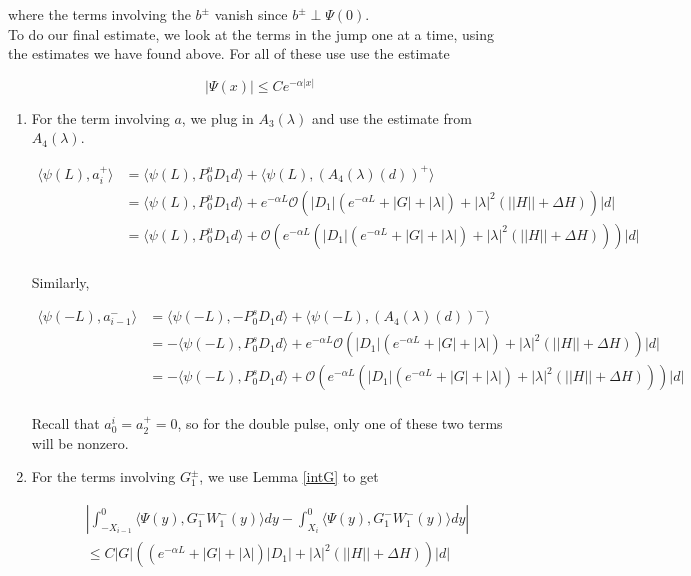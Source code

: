 \documentclass[12pt]{article}
\begin{document}
where the terms involving the $b^\pm$ vanish since $b^\pm \perp \Psi(0)$.\\

To do our final estimate, we look at the terms in the jump one at a time, using the estimates we have found above. For all of these use use the estimate

\[
|\Psi(x)| \leq C e^{-\alpha|x|}
\]

\begin{enumerate}

\item For the term involving $a$, we plug in $A_3(\lambda)$ and use the estimate from $A_4(\lambda)$.

\begin{align*}
\langle \psi(L), a_i^+ \rangle &= \langle \psi(L), P_0^u D_1 d \rangle + \langle \psi(L), (A_4(\lambda)(d))^+\rangle\\
&= \langle \psi(L), P_0^u D_1 d \rangle + e^{-\alpha L} \mathcal{O} \left(|D_1|(e^{-\alpha L} + |G| + |\lambda|) + |\lambda|^2(||H|| + \Delta H )\right)|d|\\
&= \langle \psi(L), P_0^u D_1 d \rangle + \mathcal{O} \left( e^{-\alpha L} \left(|D_1|(e^{-\alpha L} + |G| + |\lambda|) + |\lambda|^2(||H|| + \Delta H )\right)\right)|d|\\
\end{align*}

Similarly,

\begin{align*}
\langle \psi(-L), a_{i-1}^- \rangle &= \langle \psi(-L), -P_0^s D_1 d \rangle + \langle \psi(-L), (A_4(\lambda)(d))^-\rangle\\
&= -\langle \psi(-L), P_0^s D_1 d \rangle + e^{-\alpha L} \mathcal{O} \left(|D_1|(e^{-\alpha L} + |G| + |\lambda|) + |\lambda|^2(||H|| + \Delta H )\right)|d|\\
&= -\langle \psi(-L), P_0^s D_1 d \rangle + \mathcal{O} \left( e^{-\alpha L} \left(|D_1|(e^{-\alpha L} + |G| + |\lambda|) + |\lambda|^2(||H|| + \Delta H )\right)\right)|d|\\
\end{align*}

Recall that $a_0^i = a_2^+ = 0$, so for the double pulse, only one of these two terms will be nonzero.

\item For the terms involving $G_1^\pm$, we use Lemma \ref{intG} to get 

\begin{align*}
&\left| \int_{-X_{i-1}}^0 \langle \Psi(y), G_1^- W_1^-(y) \rangle dy - \int_{X_i}^0 \langle \Psi(y), G_1^- W_1^-(y) \rangle dy\right| \\
&\leq C|G| \left( \left(e^{-\alpha L} + |G| + |\lambda|  \right) |D_1| + |\lambda|^2 \left(||H|| + \Delta H\right) \right)|d|
\end{align*}


\end{enumerate}
\end{document}
